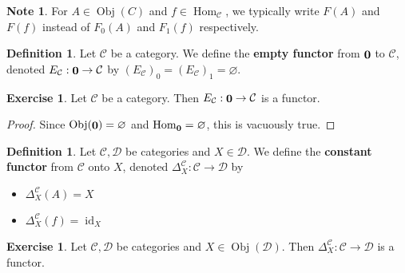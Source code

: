 \documentclass[12pt]{amsart}
\theoremstyle{definition}
\newtheorem{defn}[definition]{Definition}
\newtheorem{note}[definition]{Note}
\newtheorem{ex}[definition]{Exercise}
\newcommand{\Del}{\Delta}
\newcommand{\MC}{\mathcal{C}}
\newcommand{\MD}{\mathcal{D}}
\DeclareMathOperator{\id}{id}
\DeclareMathOperator{\Obj}{Obj}
\DeclareMathOperator{\Hom}{Hom}
\DeclareMathOperator*{\0}{\mbf{0}}
\DeclareMathOperator*{\1}{\mbf{1}}
\begin{document}
	\begin{note}
		For $A \in \Obj(C)$ and $f \in \Hom_{\MC}$, we typically write $F(A)$ and $F(f)$ instead of $F_0(A)$ and $F_1(f)$ respectively.
	\end{note}

	\begin{defn}
		Let $\MC$ be a category. We define the \textbf{empty functor} from $\0$ to $\MC$, denoted $E_{\MC}: \0 \rightarrow \MC$ by $(E_{\MC})_0 = (E_{\MC})_1 = \varnothing$. 
	\end{defn}

	\begin{ex}
		Let $\MC$ be a category. Then $E_{\MC}: \0 \rightarrow \MC$ is a functor.
	\end{ex}

	\begin{proof}
		Since $\Obj(\0) = \varnothing$ and $\Hom_{\0} = \varnothing$, this is vacuously true. 
	\end{proof}

	\begin{defn}
		Let $\MC, \MD$ be categories and $X \in \MD$. We define the \textbf{constant functor} from $\MC$ onto $X$, denoted $\Del^{\MC}_X: \MC \rightarrow \MD$ by 
		\begin{itemize}
			\item $\Del^{\MC}_X (A) = X$
			\item $\Del^{\MC}_X (f) = \id_X$
		\end{itemize}
	\end{defn}
	
	\begin{ex}
		Let $\MC, \MD$ be categories and $X \in \Obj(\MD)$. Then $\Del^{\MC}_X : \MC \rightarrow \MD$ is a functor.
	\end{ex}
\end{document}
